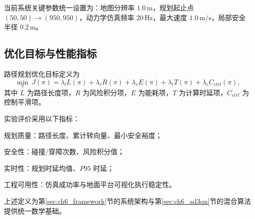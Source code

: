 当前系统关键参数统一设置为：地图分辨率 $1.0\,\mathrm{m}$，规划起止点 $(50,50)\rightarrow(950,950)$，动力学仿真频率 $20\,\mathrm{Hz}$，最大速度 $1.0\,\mathrm{m/s}$，局部安全半径 $0.2\,\mathrm{m}$。

\subsection{优化目标与性能指标}
\label{subsec:ch6_objective}

路径规划优化目标定义为
\begin{equation}
\min_{\pi}\ J(\pi)=
\lambda_l L(\pi)
+\lambda_r R(\pi)
+\lambda_e E(\pi)
+\lambda_t T(\pi)
+\lambda_c C_{ctrl}(\pi),
\label{eq:ch6_objective}
\end{equation}
其中 $L$ 为路径长度项，$R$ 为风险积分项，$E$ 为能耗项，$T$ 为计算时延项，$C_{ctrl}$ 为控制平滑项。

实验评价采用以下指标：
\begin{myitemize}
	\item 规划质量：路径长度、累计转向量、最小安全裕度；
	\item 安全性：碰撞/穿障次数、风险积分值；
	\item 实时性：规划时延均值、$P95$ 时延；
	\item 工程可用性：仿真成功率与地面平台可视化执行稳定性。
\end{myitemize}

上述定义为第\ref{sec:ch6_framework}节的系统架构与第\ref{sec:ch6_ad3qn}节的混合算法提供统一数学基础。

